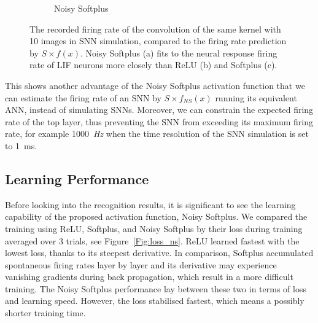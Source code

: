 \documentclass{article}
\begin{document}
\begin{figure}[hb!]
\begin{subfigure}[hb]{0.32\textwidth}
			\caption{Noisy Softplus}
		\end{subfigure}
		\caption{
			The recorded firing rate of the convolution of the same kernel with 10 images in SNN simulation, compared to the firing rate prediction by $S \times f(x)$.
			Noisy Softplus (a) fits to the neural response firing rate of LIF neurons more closely than ReLU (b) and Softplus (c).}
		\label{fig:af_compare}
	\end{figure}		
	
	This shows another advantage of the Noisy Softplus activation function that we can estimate the firing rate of an SNN by $S \times f_{NS}(x)$ running its equivalent ANN, instead of simulating SNNs.
	Moreover, we can constrain the expected firing rate of the top layer, thus preventing the SNN from exceeding its maximum firing rate, for example 1000~\textit{Hz} when the time resolution of the SNN simulation is set to 1~ms.
	
	
	\subsection{Learning Performance}
	Before looking into the recognition results, it is significant to see the learning capability of the proposed activation function, Noisy Softplus.
	We compared the training using ReLU, Softplus, and Noisy Softplus by their loss during training averaged over 3 trials, see Figure~\ref{Fig:loss_ns}.
	ReLU learned fastest with the lowest loss, thanks to its steepest derivative.
	In comparison, Softplus accumulated spontaneous firing rates layer by layer and its derivative may experience vanishing gradients during back propagation, which result in a more difficult training.
	The Noisy Softplus performance lay between these two in terms of loss and learning speed.
	However, the loss stabilised fastest, which means a possibly shorter training time.
	
\end{document}
